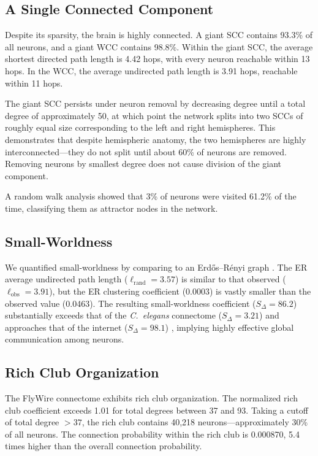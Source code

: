 \documentclass{article}
\begin{document}
\subsection{A Single Connected Component}

Despite its sparsity, the brain is highly connected. A giant SCC contains 93.3\% of all neurons, and a giant WCC contains 98.8\%. Within the giant SCC, the average shortest directed path length is 4.42 hops, with every neuron reachable within 13 hops. In the WCC, the average undirected path length is 3.91 hops, reachable within 11 hops.

The giant SCC persists under neuron removal by decreasing degree until a total degree of approximately 50, at which point the network splits into two SCCs of roughly equal size corresponding to the left and right hemispheres. This demonstrates that despite hemispheric anatomy, the two hemispheres are highly interconnected---they do not split until about 60\% of neurons are removed. Removing neurons by smallest degree does not cause division of the giant component.

A random walk analysis showed that 3\% of neurons were visited 61.2\% of the time, classifying them as attractor nodes in the network.

\subsection{Small-Worldness}

We quantified small-worldness by comparing to an Erd\H{o}s--R\'{e}nyi graph \citep{erdos1959random}. The ER average undirected path length ($\ell_\text{rand} = 3.57$) is similar to that observed ($\ell_\text{obs} = 3.91$), but the ER clustering coefficient (0.0003) is vastly smaller than the observed value (0.0463). The resulting small-worldness coefficient ($S_\Delta = 86.2$) substantially exceeds that of the \textit{C.~elegans} connectome ($S_\Delta = 3.21$) and approaches that of the internet ($S_\Delta = 98.1$) \citep{humphries2008network}, implying highly effective global communication among neurons.

\subsection{Rich Club Organization}

The FlyWire connectome exhibits rich club organization. The normalized rich club coefficient exceeds 1.01 for total degrees between 37 and 93. Taking a cutoff of total degree $> 37$, the rich club contains 40,218 neurons---approximately 30\% of all neurons. The connection probability within the rich club is 0.000870, 5.4 times higher than the overall connection probability.
\end{document}
